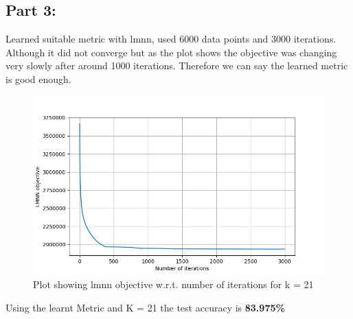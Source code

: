 \documentclass[a4paper,11pt]{article}
\begin{document}
\begin{mlsolution}
\subsection*{Part 3:}
Learned suitable metric with lmnn, used 6000 data points and 3000 iterations. Although it did not converge but as the plot shows the objective was changing very slowly after around 1000 iterations. Therefore we can say the learned metric is good enough.
\begin{figure}[th]
\centering
\includegraphics[width=\columnwidth]{Figure_1.png}
\caption{Plot showing lmnn objective w.r.t. number of iterations for k = 21}
\label{fig:proto}
\end{figure}

Using the learnt Metric and K = 21 the test accuracy is \textbf{83.975\%}

\end{mlsolution}	
\end{document}
